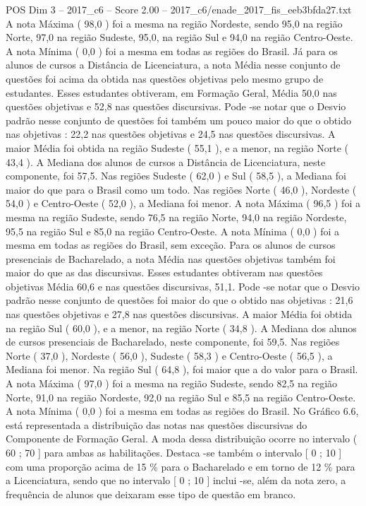 \begin{textsample}{POS Dim 3 – 2017\_c6 – Score 2.00 – 2017\_c6/enade\_2017\_fis\_eeb3bfda27.txt}
A nota Máxima ( 98,0 ) foi a mesma na região Nordeste, sendo 95,0 na região Norte, 97,0 na região Sudeste, 95,0, na região Sul e 94,0 na região Centro-Oeste.
A nota Mínima ( 0,0 ) foi a mesma em todas as regiões do Brasil.
Já para os alunos de cursos a Distância de Licenciatura, a nota Média nesse conjunto de questões foi acima da obtida nas questões objetivas pelo mesmo grupo de estudantes.
Esses estudantes obtiveram, em Formação Geral, Média 50,0 nas questões objetivas e 52,8 nas questões discursivas.
Pode -se notar que o Desvio padrão nesse conjunto de questões foi também um pouco maior do que o obtido nas objetivas : 22,2 nas questões objetivas e 24,5 nas questões discursivas.
A maior Média foi obtida na região Sudeste ( 55,1 ), e a menor, na região Norte ( 43,4 ).
A Mediana dos alunos de cursos a Distância de Licenciatura, neste componente, foi 57,5.
Nas regiões Sudeste ( 62,0 ) e Sul ( 58,5 ), a Mediana foi maior do que para o Brasil como um todo.
Nas regiões Norte ( 46,0 ), Nordeste ( 54,0 ) e Centro-Oeste ( 52,0 ), a Mediana foi menor.
A nota Máxima ( 96,5 ) foi a mesma na região Sudeste, sendo 76,5 na região Norte, 94,0 na região Nordeste, 95,5 na região Sul e 85,0 na região Centro-Oeste.
A nota Mínima ( 0,0 ) foi a mesma em todas as regiões do Brasil, sem exceção.
Para os alunos de cursos presenciais de Bacharelado, a nota Média nas questões objetivas também foi maior do que as das discursivas.
Esses estudantes obtiveram nas questões objetivas Média 60,6 e nas questões discursivas, 51,1.
Pode -se notar que o Desvio padrão nesse conjunto de questões foi maior do que o obtido nas objetivas : 21,6 nas questões objetivas e 27,8 nas questões discursivas.
A maior Média foi obtida na região Sul ( 60,0 ), e a menor, na região Norte ( 34,8 ).
A Mediana dos alunos de cursos presenciais de Bacharelado, neste componente, foi 59,5.
Nas regiões Norte ( 37,0 ), Nordeste ( 56,0 ), Sudeste ( 58,3 ) e Centro-Oeste ( 56,5 ), a Mediana foi menor.
Na região Sul ( 64,8 ), foi maior que a do valor para o Brasil.
A nota Máxima ( 97,0 ) foi a mesma na região Sudeste, sendo 82,5 na região Norte, 91,0 na região Nordeste, 92,0 na região Sul e 85,5 na região Centro-Oeste.
A nota Mínima ( 0,0 ) foi a mesma em todas as regiões do Brasil.
No Gráfico 6.6, está representada a distribuição das notas nas questões discursivas do Componente de Formação Geral.
A moda dessa distribuição ocorre no intervalo ( 60 ; 70 ] para ambas as habilitações.
Destaca -se também o intervalo [ 0 ; 10 ] com uma proporção acima de 15 \% para o Bacharelado e em torno de 12 \% para a Licenciatura, sendo que no intervalo [ 0 ; 10 ] inclui -se, além da nota zero, a frequência de alunos que deixaram esse tipo de questão em branco.

\end{textsample}

